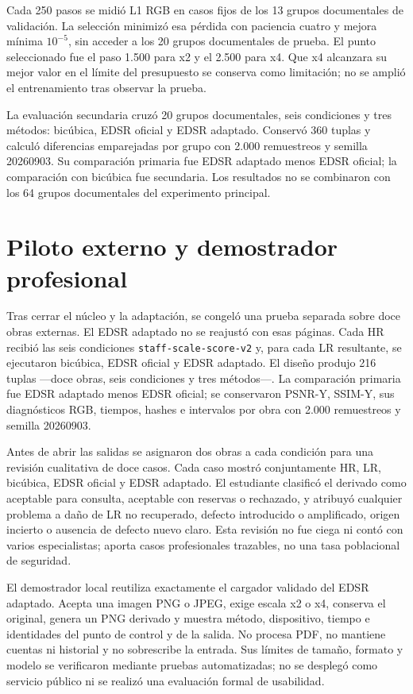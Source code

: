 Cada 250 pasos se midió L1 RGB en casos fijos de los 13 grupos documentales de validación. La selección minimizó
esa pérdida con paciencia cuatro y mejora mínima \(10^{-5}\), sin acceder a los 20 grupos documentales de prueba.
El punto seleccionado fue el paso 1.500 para x2 y el 2.500 para x4. Que x4 alcanzara su mejor valor
en el límite del presupuesto se conserva como limitación; no se amplió el entrenamiento tras
observar la prueba.

La evaluación secundaria cruzó 20 grupos documentales, seis condiciones y tres métodos: bicúbica, EDSR oficial y
EDSR adaptado. Conservó 360 tuplas y calculó diferencias emparejadas por grupo con 2.000 remuestreos
y semilla 20260903. Su comparación primaria fue EDSR adaptado menos EDSR oficial; la comparación
con bicúbica fue secundaria. Los resultados no se combinaron con los 64 grupos documentales del experimento
principal.

\section{Piloto externo y demostrador profesional}
Tras cerrar el núcleo y la adaptación, se congeló una prueba separada sobre doce obras externas.
El EDSR adaptado no se reajustó con esas páginas. Cada HR recibió las seis condiciones
\texttt{staff-scale-score-v2} y, para cada LR resultante, se ejecutaron bicúbica, EDSR oficial y
EDSR adaptado. El diseño produjo 216 tuplas ---doce obras, seis condiciones y tres métodos---. La
comparación primaria fue EDSR adaptado menos EDSR oficial; se conservaron PSNR-Y, SSIM-Y, sus
diagnósticos RGB, tiempos, hashes e intervalos por obra con 2.000 remuestreos y semilla 20260903.

Antes de abrir las salidas se asignaron dos obras a cada condición para una revisión cualitativa
de doce casos. Cada caso mostró conjuntamente HR, LR, bicúbica, EDSR oficial y EDSR adaptado. El
estudiante clasificó el derivado como aceptable para consulta, aceptable con reservas o rechazado,
y atribuyó cualquier problema a daño de LR no recuperado, defecto introducido o amplificado, origen
incierto o ausencia de defecto nuevo claro. Esta revisión no fue ciega ni contó con varios
especialistas; aporta casos profesionales trazables, no una tasa poblacional de seguridad.

El demostrador local reutiliza exactamente el cargador validado del EDSR adaptado. Acepta una imagen
PNG o JPEG, exige escala x2 o x4, conserva el original, genera un PNG derivado y muestra método,
dispositivo, tiempo e identidades del punto de control y de la salida. No procesa PDF, no mantiene
cuentas ni historial y no sobrescribe la entrada. Sus límites de tamaño, formato y modelo se
verificaron mediante pruebas automatizadas; no se desplegó como servicio público ni se realizó una
evaluación formal de usabilidad.

